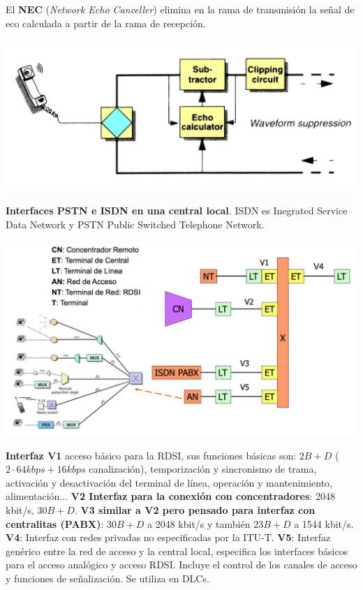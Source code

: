 \documentclass[10pt,portrait, twocolumn]{article}
\begin{document}
El \textbf{NEC} (\textit{Network Echo Canceller}) elimina en la rama de transmisión la señal de eco calculada a partir de la rama de recepción.

	\begin{center}
		\includegraphics[scale=0.2]{images/NEC}
	\end{center}

\textbf{Interfaces PSTN e ISDN en una central local}. ISDN es Inegrated Service Data Network y PSTN Public Switched Telephone Network.

	\begin{center}
		\includegraphics[scale=0.35]{images/ISDN}
	\end{center}

\textbf{Interfaz V1} acceso básico para la RDSI, sus funciones básicas son: $2B + D$ ($2 \cdot 64 kbps + 16 kbps$ canalización), temporización y sincronismo de trama, activación y desactivación del terminal de línea, operación y mantenimiento, alimentación... \textbf{V2 Interfaz para la conexión con concentradores}: 2048 kbit/s, $30B + D$. \textbf{V3 similar a V2 pero pensado para interfaz con centralitas (PABX)}: $30B + D$ a 2048 kbit/s y también $23B+D$ a 1544 kbit/s. \textbf{V4}: Interfaz con redes privadas no especificadas por la ITU-T. \textbf{V5}: Interfaz genérico entre la red de acceso y la central local, especifica los interfaces básicos para el acceso analógico y acceso RDSI. Incluye el control de los canales de acceso y funciones de señalización. Se utiliza en DLCs.
\end{document}
